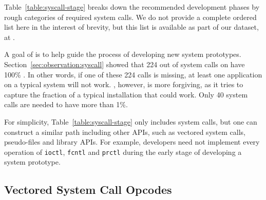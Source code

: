 Table~\ref{table:syscall-stage} breaks down the recommended development phases by rough categories of required system calls.
We do not provide a complete ordered list here in the interest of brevity, but this list is available as part of our dataset, 
at \projecturl{}.

A goal of \compatmetric{} is to help guide the process of developing new system prototypes.
Section~\ref{sec:observation:syscall} showed that 224 out of \syscallnum{} system calls on \osdist{} have 100\% \usagemetric{}.
In other words, if one of these 224 calls is missing, at least one application on a typical system will not work.
\Compatmetric{}, however, is more forgiving, as
it tries to capture the fraction of a typical installation that could work.
Only 
40 system calls are needed to have \compatmetric{} more than 1\%.


For simplicity, Table~\ref{table:syscall-stage}
only includes system calls, %
but one can construct a similar path including other APIs, %
such as vectored system calls, pseudo-files and library APIs.
For example, developers need not implement every operation of
{\tt ioctl}, {\tt fcntl} and {\tt prctl}
during the early stage of developing a system prototype.


\subsection{Vectored System Call Opcodes}
\label{sec:observation:vector}

